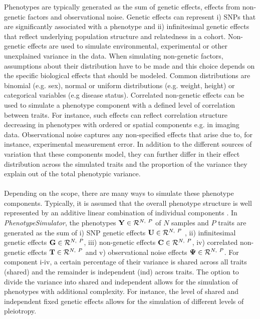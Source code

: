 Phenotypes are typically generated as the sum of genetic effects, effects from non-genetic factors and observational noise. Genetic effects can represent i) SNPs that are significantly associated with a phenotype and ii) infinitesimal genetic effects that reflect underlying population structure and relatedness in a cohort. Non-genetic effects are used to simulate environmental, experimental or other unexplained variance in the data. When simulating non-genetic factors, assumptions about their distribution have to be made and this choice depends on the specific biological effects that should be modeled. Common distributions are binomial (e.g. sex), normal or uniform distributions (e.g. weight, height) or categorical variables (e.g disease status).  Correlated non-genetic effects can be used to simulate a phenotype component with a defined level of correlation between traits. For instance, such effects can reflect correlation structure decreasing in phenotypes with ordered or spatial components e.g. in imaging data. Observational noise captures any non-specified effects that arise due to, for instance, experimental measurement error. In addition to the different sources of variation that these components model, they can further differ in their effect distribution across the simulated traits and the proportion of the variance they explain out of the total phenotypic variance. 
\\
\\
Depending on the scope, there are many ways to simulate these phenotype components. Typically, it is assumed that the overall phenotype structure is well represented by an additive linear combination of individual components \citep{Stephens2013,Marigorta2014,Zhou2014,Loh2014}. In \textit{PhenotypeSimulator}, the phenotypes \( \boldsymbol{\mathbf{Y}} \in \mathcal{R}^{N,~P}\) of \(N\) samples and \(P\) traits are generated as the sum of i) SNP genetic effects \( \boldsymbol{\mathbf{U}}  \in \mathcal{R}^{N,~P}\) , ii) infinitesimal genetic effects \( \boldsymbol{\mathbf{G}} \in \mathcal{R}^{N,~P}\), iii) non-genetic effects \( \boldsymbol{\mathbf{C}} \in \mathcal{R}^{N,~P}\),  iv) correlated non-genetic effects \( \boldsymbol{\mathbf{T}} \in \mathcal{R}^{N,~P}\) and  v) observational noise effects \( \boldsymbol{\mathbf{\Psi}} \in \mathcal{R}^{N,~P}\). For component i-iv, a certain percentage of their variance is shared across all traits (shared) and the remainder is independent (ind) across traits. The option to divide the variance into shared and independent allows for the simulation of phenotypes with additional complexity. For instance, the level of shared and independent fixed genetic effects allows for the simulation of different levels of pleiotropy.
